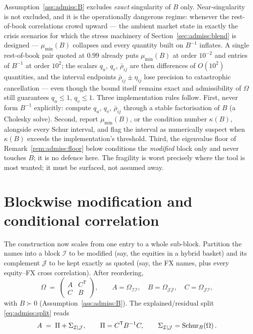 \begin{remark}\label{rem:admiss:Bcond}
Assumption~\ref{ass:admiss:B} excludes \emph{exact} singularity of $B$
only. Near-singularity is not excluded, and it is the operationally
dangerous regime: whenever the rest-of-book correlations crowd upward ---
the ambient market state in exactly the crisis scenarios for which the
stress machinery of Section~\ref{sec:admiss:blend} is designed ---
$\mu_{\min}(B)$ collapses and every quantity built on $B^{-1}$ inflates.
A single rest-of-book pair quoted at $0.99$ already puts $\mu_{\min}(B)$
at order $10^{-2}$ and entries of $B^{-1}$ at order $10^{2}$; the scalars
$q_u$, $q_v$, $\bar\rho_{ij}$ are then differences of $O(10^{2})$
quantities, and the interval endpoints $\bar\rho_{ij} \pm \eta_{ij}$ lose
precision to catastrophic cancellation --- even though the bound itself
remains exact and admissibility of $\Omega$ still guarantees
$q_u \le 1$, $q_v \le 1$. Three implementation rules follow. First, never
form $B^{-1}$ explicitly: compute $q_u$, $q_v$, $\bar\rho_{ij}$ through a
stable factorisation of $B$ (a Cholesky solve). Second, report
$\mu_{\min}(B)$, or the condition number $\kappa(B)$, alongside every
Schur interval, and flag the interval as numerically suspect when
$\kappa(B)$ exceeds the implementation's threshold. Third, the
eigenvalue floor of Remark~\ref{rem:admiss:floor} below conditions the
\emph{modified} block only and never touches $B$; it is no defence
here. The fragility is worst precisely where the tool is most wanted; it
must be surfaced, not assumed away.
\end{remark}

\section{Blockwise modification and conditional correlation}
\label{sec:admiss:block}

The construction now scales from one entry to a whole sub-block. Partition
the names into a block $\mathcal{I}$ to be modified (say, the equities in a
hybrid basket) and its complement $\mathcal{J}$ to be kept exactly as quoted
(say, the FX names, plus every equity--FX cross correlation). After
reordering,
\begin{equation}\label{eq:admiss:blockOmega}
  \Omega \;=\;
  \begin{pmatrix} A & C^{\mathsf T} \\ C & B \end{pmatrix},
  \qquad
  A = \Omega_{\mathcal I \mathcal I}, \quad
  B = \Omega_{\mathcal J \mathcal J}, \quad
  C = \Omega_{\mathcal J \mathcal I},
\end{equation}
with $B \succ 0$ (Assumption~\ref{ass:admiss:B}). The explained/residual
split \eqref{eq:admiss:split} reads
\begin{equation}\label{eq:admiss:APi}
  A \;=\; \Pi + \Sigma_{\mathcal I|\mathcal J},
  \qquad
  \Pi = C^{\mathsf T} B^{-1} C,
  \qquad
  \Sigma_{\mathcal I|\mathcal J} = \mathrm{Schur}_{B}\!\left(\Omega\right) .
\end{equation}


